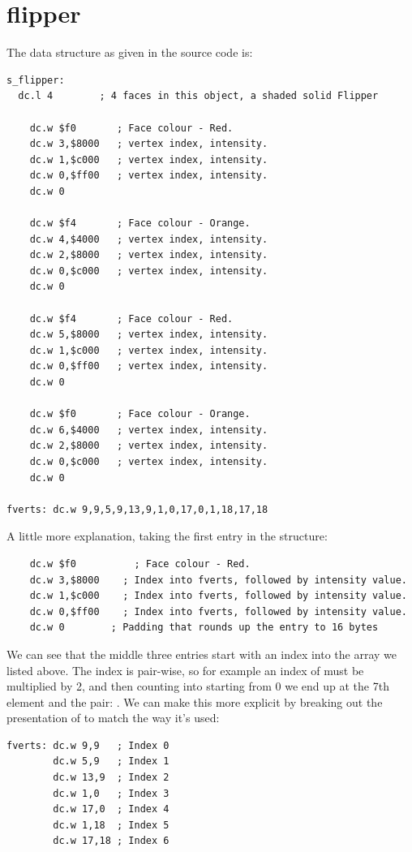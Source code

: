 \chapter{flipper}
\lhead[tempest 2000]{}
\label{sec:listing}
\lstset{style=68KStyle}

The data structure as given in the source code is:

\begin{lstlisting}
s_flipper: 
  dc.l 4        ; 4 faces in this object, a shaded solid Flipper
    
	dc.w $f0       ; Face colour - Red.
	dc.w 3,$8000   ; vertex index, intensity.
	dc.w 1,$c000   ; vertex index, intensity.
	dc.w 0,$ff00   ; vertex index, intensity.
	dc.w 0
    
	dc.w $f4       ; Face colour - Orange.
	dc.w 4,$4000   ; vertex index, intensity.
	dc.w 2,$8000   ; vertex index, intensity.
	dc.w 0,$c000   ; vertex index, intensity.
	dc.w 0
    
	dc.w $f4       ; Face colour - Red.
	dc.w 5,$8000   ; vertex index, intensity.
	dc.w 1,$c000   ; vertex index, intensity.
	dc.w 0,$ff00   ; vertex index, intensity.
	dc.w 0
    
	dc.w $f0       ; Face colour - Orange.
	dc.w 6,$4000   ; vertex index, intensity.
	dc.w 2,$8000   ; vertex index, intensity.
	dc.w 0,$c000   ; vertex index, intensity.
	dc.w 0

fverts: dc.w 9,9,5,9,13,9,1,0,17,0,1,18,17,18
\end{lstlisting}

A little more explanation, taking the first entry in the structure:
\begin{lstlisting}
	dc.w $f0		  ; Face colour - Red.
	dc.w 3,$8000	; Index into fverts, followed by intensity value.
	dc.w 1,$c000	; Index into fverts, followed by intensity value.
	dc.w 0,$ff00	; Index into fverts, followed by intensity value.
	dc.w 0        ; Padding that rounds up the entry to 16 bytes
\end{lstlisting}

We can see that the middle three entries start with an index into the array  we listed above.
The index is pair-wise, so for example an index of  must be multiplied by 2, and then counting into 
starting from 0 we end up at the 7th element and the pair: . We can make this more explicit by breaking out the
presentation of  to match the way it's used:
\begin{lstlisting}
fverts: dc.w 9,9   ; Index 0
        dc.w 5,9   ; Index 1
        dc.w 13,9  ; Index 2
        dc.w 1,0   ; Index 3
        dc.w 17,0  ; Index 4
        dc.w 1,18  ; Index 5
        dc.w 17,18 ; Index 6
\end{lstlisting}

